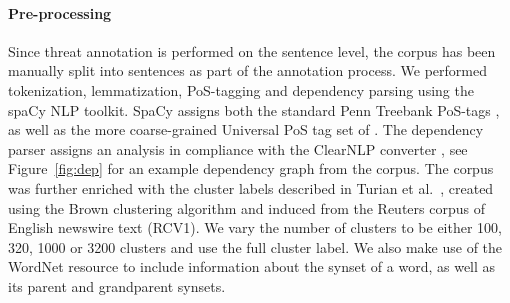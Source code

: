 \documentclass[11pt,letterpaper]{article}
\let\tag=\textsc
\begin{document}
\paragraph{Pre-processing}Since threat annotation is performed on the sentence level, the corpus has been manually split into sentences as part of the annotation process.  We performed tokenization, lemmatization, PoS-tagging and dependency parsing using the spaCy NLP toolkit. SpaCy assigns both the standard Penn Treebank PoS-tags \cite{Mar:San:Mar:93}, as well as the more coarse-grained Universal PoS tag set of . The dependency parser assigns an analysis in compliance with the ClearNLP converter \cite{Cho:Pal:12}, see Figure~\ref{fig:dep} for an example dependency graph from the corpus. The corpus was further enriched with the cluster labels described in Turian et al.~, created using the Brown clustering algorithm \cite{Bro:deS:Mer:92} and induced from the Reuters corpus of English newswire text (RCV1).
We vary the number of clusters to be either 100, 320, 1000 or 3200 clusters and use the full cluster label.  We also make use of the WordNet resource \cite{wordnet} to include information about the synset of a word, as well as its parent and grandparent synsets.

\end{document}
